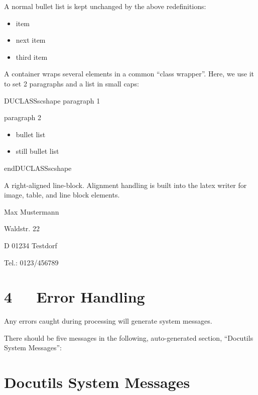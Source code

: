 \documentclass[a4paper]{article}
\newenvironment{DUclass}[1]%
    {%
     \def\DocutilsClassFunctionName{DUCLASS#1}
     \csname \DocutilsClassFunctionName \endcsname}%
    {\csname end\DocutilsClassFunctionName \endcsname}%
\newenvironment{DUlineblock}[1]{%
    \list{}{\setlength{\partopsep}{\parskip}
            \addtolength{\partopsep}{\baselineskip}
            \setlength{\topsep}{0pt}
            \setlength{\itemsep}{0.15\baselineskip}
            \setlength{\parsep}{0pt}
            \setlength{\leftmargin}{#1}}
    \raggedright
  }
  {\endlist}
\begin{document}
A normal bullet list is kept unchanged by the above redefinitions:

\begin{itemize}
\item item

\item next item

\item third item
\end{itemize}

A container wraps several elements in a common “class wrapper”. Here, we use
it to set 2 paragraphs and a list in small caps:

\newcommand*{\DUCLASSscshape}{\scshape}

\begin{DUclass}{scshape}
paragraph 1

paragraph 2

\begin{itemize}
\item bullet list

\item still bullet list
\end{itemize}
\end{DUclass}

A right-aligned line-block. Alignment handling is built into the latex
writer for image, table, and line block elements.

\begin{DUlineblock}{0em}
\raggedleft
\item[] Max Mustermann
\item[] Waldstr. 22
\item[] D 01234 Testdorf
\item[] Tel.: 0123/456789
\end{DUlineblock}



\section{4   Error Handling}

Any errors caught during processing will generate system messages.

There should be five messages in the following, auto-generated
section, “Docutils System Messages”:



\section[Docutils System Messages]{\color{red}Docutils System Messages}
\end{document}

